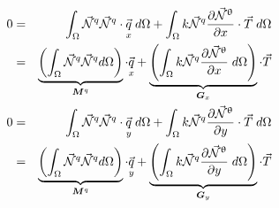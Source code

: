 \begin{eqnarray}
0&=& \int_\Omega \vec{{\mathcal{N}}}^q \vec{{\mathcal{N}}}^q \cdot \vec{\underset{\tiny x}{q}} \; d\Omega
+ \int _\Omega k \vec{{\mathcal{N}}}^q   \frac{\partial \vec{{\mathcal{N}}}^\uptheta}{\partial x}\cdot \vec{T} \; d\Omega \nonumber\\ 
&=& \underbrace{\left( \int_\Omega \vec{{\mathcal{N}}}^q \vec{{\mathcal{N}}}^q d\Omega \right)}_{{\bm M}^q}  \cdot \vec{\underset{\tiny x}{q}} 
+ \underbrace{\left(\int _\Omega k \vec{{\mathcal{N}}}^q  \frac{\partial \vec{{\mathcal{N}}}^\uptheta}{\partial x}\; d\Omega\right)}_{{\bm G}_x} \cdot \vec{T} \label{eq:htediff4}\\ 
0&=& \int_\Omega \vec{{\mathcal{N}}}^q \vec{{\mathcal{N}}}^q \cdot \vec{\underset{\tiny y}{q}} \; d\Omega
+ \int _\Omega k \vec{{\mathcal{N}}}^q   \frac{\partial \vec{{\mathcal{N}}}^\uptheta}{\partial y} \cdot \vec{T} \;  d\Omega \nonumber\\ 
&=& \underbrace{\left( \int_\Omega \vec{{\mathcal{N}}}^q \vec{{\mathcal{N}}}^q d\Omega \right)}_{{\bm M}^q}  \cdot \vec{\underset{\tiny y}{q}} 
+ \underbrace{\left(\int _\Omega k \vec{{\mathcal{N}}}^q  \frac{\partial \vec{{\mathcal{N}}}^\uptheta}{\partial y} \; d\Omega\right)}_{{\bm G}_y} \cdot \vec{T} \label{eq:htediff5}
\end{eqnarray}

